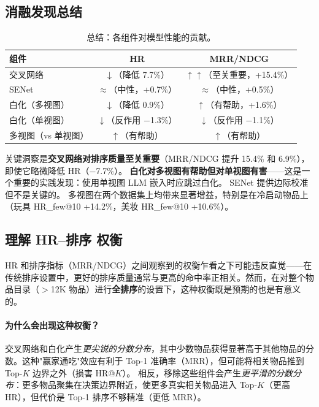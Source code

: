\documentclass[sigconf,natbib=true]{acmart}
\newcommand{\llm}{\textsc{LLM}\xspace}
\begin{document}
\subsection{消融发现总结}

\begin{table}[t]
\caption{总结：各组件对模型性能的贡献。}
\label{tab:ablation_summary}
\centering
\small
\begin{tabular}{lcc}
\toprule
\textbf{组件} & \textbf{HR} & \textbf{MRR/NDCG} \\
\midrule
交叉网络 & $\downarrow$（降低 7.7\%） & $\uparrow\uparrow$（至关重要，+15.4\%） \\
SENet & $\approx$（中性，+0.7\%） & $\approx$（中性，+0.5\%） \\
白化（多视图） & $\downarrow$（降低 0.9\%） & $\uparrow$（有帮助，+1.6\%） \\
白化（单视图） & $\downarrow$（反作用 $-$1.3\%） & $\downarrow$（反作用 $-$1.1\%） \\
多视图（vs 单视图） & $\uparrow$（有帮助） & $\uparrow$（有帮助） \\
\bottomrule
\end{tabular}
\end{table}

关键洞察是\textbf{交叉网络对排序质量至关重要}（MRR/NDCG 提升 15.4\% 和 6.9\%），即使它略微降低 HR（$-$7.7\%）。
\textbf{白化对多视图有帮助但对单视图有害}——这是一个重要的实践发现：使用单视图 \llm 嵌入时应跳过白化。
SENet 提供边际校准但不是关键的。
多视图在两个数据集上均带来显著增益，特别是在冷启动物品上（玩具 HR\_few@10 +14.2\%，美妆 HR\_few@10 +10.6\%）。

\subsection{理解 HR--排序 权衡}

HR 和排序指标（MRR/NDCG）之间观察到的权衡乍看之下可能违反直觉——在传统排序设置中，更好的排序质量通常与更高的命中率正相关。然而，在对整个物品目录（$>$12K 物品）进行\textbf{全排序}的设置下，这种权衡既是预期的也是有意义的。

\paragraph{为什么会出现这种权衡？}
交叉网络和白化产生\emph{更尖锐的分数分布}，其中少数物品获得显著高于其他物品的分数。这种"赢家通吃"效应有利于 Top-1 准确率（MRR），但可能将相关物品推到 Top-$K$ 边界之外（损害 HR@$K$）。
相反，移除这些组件会产生\emph{更平滑的分数分布}：更多物品聚集在决策边界附近，使更多真实相关物品进入 Top-$K$（更高 HR），但代价是 Top-1 排序不够精准（更低 MRR）。
\end{document}
